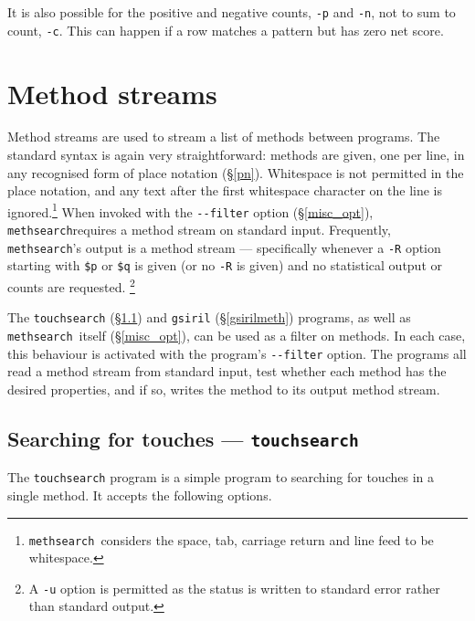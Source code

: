 \documentclass[a4paper,11pt,oneside]{book}
\makeatletter
\newcommand{\ttcmdidx}[1]{\texttt{#1}\index{#1@{\texttt{#1}}}}
\def\methsearch{\texttt{meth\-search}}
\newcommand{\sref}[1]{\hyperref[#1]{\S\ref{#1}}}
\makeatother
\begin{document}
It is also possible for the positive and negative counts, 
\verb+-p+ and \verb+-n+, not to sum to count, \verb+-c+.  This can happen
if a row matches a pattern but has zero net score.  


\section{Method streams}\label{methstream}

Method streams are used to stream a list of methods between programs.  
The standard syntax is again very straightforward: methods are given,
one per line, in any recognised form of place notation (\sref{pn}).  
Whitespace is not permitted in the place notation, and any text after
the first whitespace character on the line is ignored.\footnote{%
\methsearch\ considers the space, tab, carriage return and line feed
to be whitespace.}
When invoked with the \verb+--filter+ option (\sref{misc_opt}), 
\methsearch requires a method stream on standard input.
Frequently, \methsearch's output is a method stream — specifically
whenever a \verb+-R+ option starting with \verb+$p+ or \verb+$q+ is given
(or no \verb+-R+ is given) and no statistical output or counts are requested.%
\footnote{A \verb+-u+ option is permitted as the status is written 
to standard error rather than standard output.%
}

The \verb+touchsearch+ (\sref{touchsearch}) 
and \verb+gsiril+ (\sref{gsirilmeth}) programs, 
as well as \methsearch\ itself (\sref{misc_opt}),
can be used as a filter on methods.  
In each case, this behaviour is activated with the program's \verb+--filter+ 
option.   The programs all read a method stream from standard input,
test whether each method has the desired properties, and if so, writes
the method to its output method stream.

\subsection{Searching for touches — \texttt{touchsearch}}\label{touchsearch}

The \ttcmdidx{touchsearch} program is a simple program to searching for
touches in a single method.  It accepts the following options.
\end{document}
